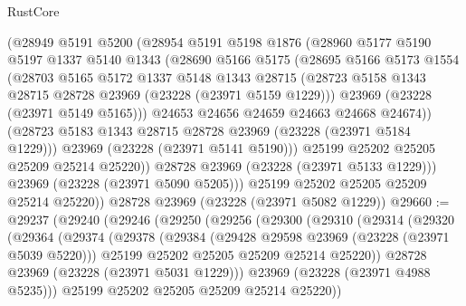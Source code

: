 \begin{lexlean}{RustCore}
\begin{coremodule}
            (@28949
              @5191
              @5200
              (@28954
                @5191
                @5198
                @1876
                (@28960
                  @5177
                  @5190
                  @5197
                  @1337
                  @5140
                  @1343
                  (@28690
                    @5166
                    @5175
                    (@28695
                      @5166
                      @5173
                      @1554
                      (@28703
                        @5165
                        @5172
                        @1337
                        @5148
                        @1343
                        @28715
                        (@28723 @5158 @1343 @28715 @28728 @23969 (@23228 (@23971 @5159 @1229)))
                        @23969
                        (@23228 (@23971 @5149 @5165)))
                      @24653
                      @24656
                      @24659
                      @24663
                      @24668
                      @24674))
                  (@28723 @5183 @1343 @28715 @28728 @23969 (@23228 (@23971 @5184 @1229)))
                  @23969
                  (@23228 (@23971 @5141 @5190)))
                @25199
                @25202
                @25205
                @25209
                @25214
                @25220))
            @28728
            @23969
            (@23228 (@23971 @5133 @1229)))
          @23969
          (@23228 (@23971 @5090 @5205)))
        @25199
        @25202
        @25205
        @25209
        @25214
        @25220))
    @28728
    @23969
    (@23228 (@23971 @5082 @1229))
@29660 := @29237
    (@29240
      (@29246
        (@29250
          (@29256
            (@29300
              (@29310
                (@29314
                  (@29320
                    (@29364
                      (@29374
                        (@29378
                          (@29384
                            (@29428 @29598 @23969 (@23228 (@23971 @5039 @5220)))
                            @25199
                            @25202
                            @25205
                            @25209
                            @25214
                            @25220))
                        @28728
                        @23969
                        (@23228 (@23971 @5031 @1229)))
                      @23969
                      (@23228 (@23971 @4988 @5235)))
                    @25199
                    @25202
                    @25205
                    @25209
                    @25214
                    @25220))

\end{coremodule}
\end{lexlean}

